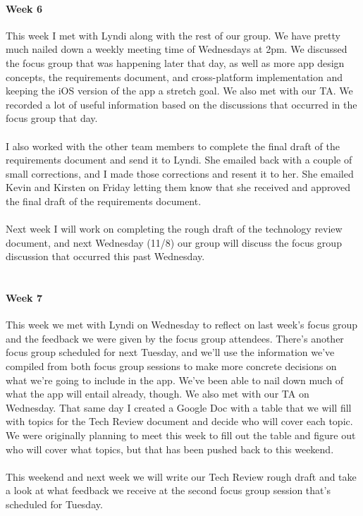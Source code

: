 \documentclass[onecolumn, draftclsnofoot,10pt, compsoc]{IEEEtran}
\begin{document}
      \paragraph{Week 6}
      This week I met with Lyndi along with the rest of our group. We have pretty much nailed down a weekly meeting time of Wednesdays at 2pm. We discussed the focus group that was happening later that day, as well as more app design concepts, the requirements document, and cross-platform implementation and keeping the iOS version of the app a stretch goal. We also met with our TA. We recorded a lot of useful information based on the discussions that occurred in the focus group that day. \\ \\
      I also worked with the other team members to complete the final draft of the requirements document and send it to Lyndi. She emailed back with a couple of small corrections, and I made those corrections and resent it to her. She emailed Kevin and Kirsten on Friday letting them know that she received and approved the final draft of the requirements document. \\ \\
      Next week I will work on completing the rough draft of the technology review document, and next Wednesday (11/8) our group will discuss the focus group discussion that occurred this past Wednesday. \\ \\

      \paragraph{Week 7}
      This week we met with Lyndi on Wednesday to reflect on last week's focus group and the feedback we were given by the focus group attendees. There's another focus group scheduled for next Tuesday, and we'll use the information we've compiled from both focus group sessions to make more concrete decisions on what we're going to include in the app. We've been able to nail down much of what the app will entail already, though. We also met with our TA on Wednesday. That same day I created a Google Doc with a table that we will fill with topics for the Tech Review document and decide who will cover each topic. We were originally planning to meet this week to fill out the table and figure out who will cover what topics, but that has been pushed back to this weekend. \\ \\
      This weekend and next week we will write our Tech Review rough draft and take a look at what feedback we receive at the second focus group session that's scheduled for Tuesday. \\ \\
\end{document}
